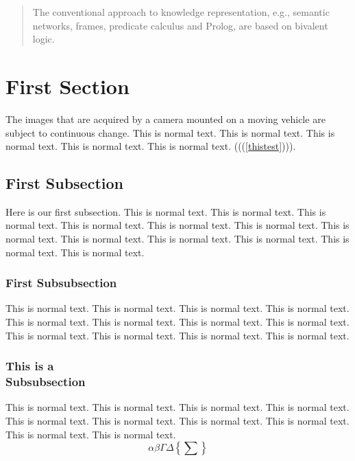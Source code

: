 

\begin{abstract}
The conventional approach to knowledge representation, e.g., semantic
networks, frames, predicate calculus and Prolog, are based on bivalent
logic.
\end{abstract}


\section{First Section}
The images that are acquired by a camera mounted on a moving vehicle 
are subject to continuous change. 
This is normal text. This is normal text. This is normal text.
This is normal text. This is normal text. \label{thistest}
(((\ref{thistest}))).



\subsection{First Subsection}
Here is our first subsection.
This is normal text. This is normal text. This is normal text.
This is normal text. This is normal text. This is normal text.
This is normal text. This is normal text. This is normal text.
This is normal text. This is normal text. This is normal text.


\subsubsection{First Subsubsection}
This is normal text.  This is normal text. This is normal text.
This is normal text. This is normal text. This is normal text.
This is normal text. This is normal text. This is normal text.
This is normal text. This is normal text. This is normal text.



\subsubsection{This is a\\ Subsubsection}
This is normal text. This is normal text. This is normal text. 
This is normal text. This is normal text. This is normal text.
This is normal text. This is normal text. This is normal text. 
This is normal text.
\begin{equation}
\alpha\beta\Gamma\Delta\left\{\sum\right\}
\end{equation}

